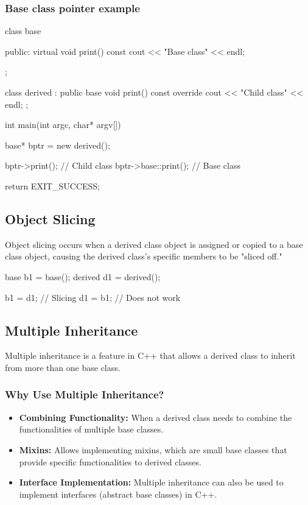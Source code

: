 \documentclass{report}
\begin{document}
    \subsubsection{Base class pointer example}
    \bigbreak \noindent 
    \begin{cppcode}
class base {

public:
    virtual void print() const {
        cout << "Base class" << endl;
    }

};


class derived : public base {
    void print() const override {
        cout << "Child class" << endl;
    }
};


int main(int argc, char* argv[]) {

    base* bptr = new derived();

    bptr->print(); // Child class
    bptr->base::print(); // Base class

    return EXIT_SUCCESS;
}
    \end{cppcode}
    \bigbreak \noindent 

    \bigbreak \noindent 
    \subsection{Object Slicing}
    \bigbreak \noindent 
    Object slicing occurs when a derived class object is assigned or copied to a base class object, causing the derived class's specific members to be "sliced off."
    \bigbreak \noindent 
    \begin{cppcode}
    base b1 = base();
    derived d1 = derived();

    b1 = d1; // Slicing
    d1 = b1; // Does not work
    \end{cppcode}

        \pagebreak 
    \subsection{Multiple Inheritance}
    \bigbreak \noindent 
    Multiple inheritance is a feature in C++ that allows a derived class to inherit from more than one base class.
    \bigbreak \noindent 
    \subsubsection{Why Use Multiple Inheritance?}
    \begin{itemize}
        \item \textbf{Combining Functionality:} When a derived class needs to combine the functionalities of multiple base classes.
        \item \textbf{Mixins:} Allows implementing mixins, which are small base classes that provide specific functionalities to derived classes.
        \item \textbf{Interface Implementation:} Multiple inheritance can also be used to implement interfaces (abstract base classes) in C++.
    \end{itemize}
\end{document}
